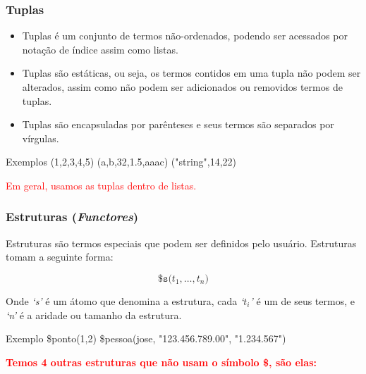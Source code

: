 
\begin{frame}
	\frametitle{Tuplas}
	\begin{itemize}
	  \item 	Tuplas é um conjunto de termos não-ordenados, podendo ser acessados por notação de índice assim como	listas.
	  
	  \item  Tuplas são estáticas, ou seja, os termos contidos em uma tupla não podem ser alterados, assim como	não podem ser adicionados ou removidos termos de tuplas.
	  
	\item   Tuplas são encapsuladas por parênteses e seus termos são separados por vírgulas.

	\end{itemize}
	
	\begin{exampleblock}{Exemplos}
		(1,2,3,4,5) \: (a,b,32,1.5,aaac) \: ("string",14,22)
	\end{exampleblock}
	
	\textcolor{red}{Em geral, usamos as tuplas dentro de listas.}
\end{frame}


\begin{frame}
	\frametitle{Estruturas (\textit{Functores})}
	
	Estruturas são termos especiais que podem ser definidos pelo usuário. Estruturas tomam a seguinte 
	forma: 
	
	\begin{displaymath}
	\texttt{{\$}s($t_1,\ldots,t_n$)}
	\end{displaymath}
	
	Onde \textit{`s'} é um átomo que denomina a estrutura, cada 
	\textit{`$t_i$'} é um de seus termos, e \textit{`n'} é a aridade ou tamanho da estrutura.
	
	\begin{exampleblock}{Exemplo}
		\$ponto(1,2) \: \$pessoa(jose, "123.456.789.00", "1.234.567")
	\end{exampleblock}
	
	\pause
	\textbf{\textcolor{red}{Temos 4 outras estruturas  que não usam o símbolo \$, são elas:}}
	
\end{frame}

